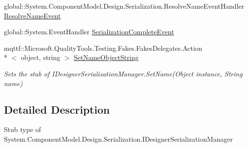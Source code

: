 \begin{DoxyCompactItemize}
global\-::\-System.\-Component\-Model.\-Design.\-Serialization.\-Resolve\-Name\-Event\-Handler \hyperlink{class_system_1_1_component_model_1_1_design_1_1_serialization_1_1_fakes_1_1_stub_i_designer_serialization_manager_ab942359d7e91c5860b4609e33df9c55f}{Resolve\-Name\-Event}
\item 
global\-::\-System.\-Event\-Handler \hyperlink{class_system_1_1_component_model_1_1_design_1_1_serialization_1_1_fakes_1_1_stub_i_designer_serialization_manager_adc118e260462cd58ef6f30d07453aba5}{Serialization\-Complete\-Event}
\item 
mqttf\-::\-Microsoft.\-Quality\-Tools.\-Testing.\-Fakes.\-Fakes\-Delegates.\-Action\\*
$<$ object, string $>$ \hyperlink{class_system_1_1_component_model_1_1_design_1_1_serialization_1_1_fakes_1_1_stub_i_designer_serialization_manager_a4dc8b912ccbec873740e54ec55eb5b39}{Set\-Name\-Object\-String}
\begin{DoxyCompactList}\small\item\em Sets the stub of I\-Designer\-Serialization\-Manager.\-Set\-Name(\-Object instance, String name)\end{DoxyCompactList}\end{DoxyCompactItemize}


\subsection{Detailed Description}
Stub type of System.\-Component\-Model.\-Design.\-Serialization.\-I\-Designer\-Serialization\-Manager



